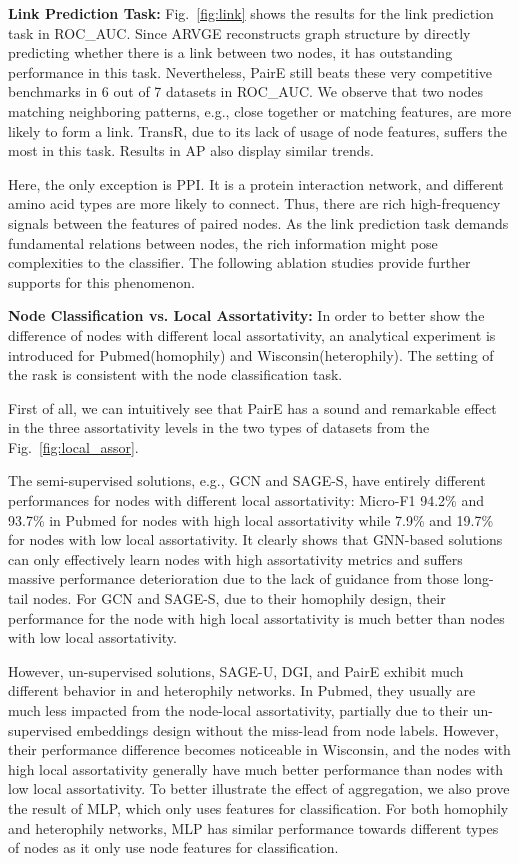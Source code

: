\documentclass[10pt,journal,compsoc]{IEEEtran}
\begin{document}
\noindent\textbf{Link Prediction Task:} Fig.~\ref{fig:link} shows the results for the link prediction task in ROC\_AUC. Since ARVGE reconstructs graph structure by directly predicting whether there is a link between two nodes, it has outstanding performance in this task. Nevertheless, PairE still beats these very competitive benchmarks in 6 out of 7 datasets in ROC\_AUC. We observe that two nodes matching neighboring patterns, e.g., close together or matching features, are more likely to form a link. TransR, due to its lack of usage of node features, suffers the most in this task. Results in AP also display similar trends. 
  
Here, the only exception is PPI. It is a protein interaction network, and different amino acid types are more likely to connect. Thus, there are rich high-frequency signals between the features of paired nodes. As the link prediction task demands fundamental relations between nodes, the rich information might pose complexities to the classifier. The following ablation studies provide further supports for this phenomenon. 


\noindent \textbf{Node Classification vs. Local Assortativity:} In order to better show the difference of nodes with different local assortativity,  an analytical experiment is introduced for Pubmed(homophily) and Wisconsin(heterophily).  The setting of the rask is consistent with the node classification task.

First of all, we can intuitively see that PairE has a sound and remarkable effect in the three assortativity levels in the two types of datasets from the Fig.~\ref{fig:local_assor}.

The semi-supervised solutions, e.g., GCN and SAGE-S, have entirely different performances for nodes with different local assortativity: Micro-F1 94.2\% and 93.7\% in Pubmed for nodes with high local assortativity while 7.9\% and 19.7\% for nodes with low local assortativity. It clearly shows that GNN-based solutions can only effectively learn nodes with high assortativity metrics and suffers massive performance deterioration due to the lack of guidance from those long-tail nodes. For GCN and SAGE-S, due to their homophily design, their performance for the node with high local assortativity is much better than nodes with low local assortativity.

However, un-supervised solutions, SAGE-U, DGI, and PairE exhibit much different behavior in  and heterophily networks. In Pubmed, they usually are much less impacted from the node-local assortativity, partially due to their un-supervised embeddings design without the miss-lead from node labels. However, their performance difference becomes noticeable in Wisconsin, and the nodes with high local assortativity generally have much better performance than nodes with low local assortativity. To better illustrate the effect of aggregation, we also prove the result of MLP, which only uses features for classification. For both homophily and heterophily networks, MLP has similar performance towards different types of nodes as it only use node features for classification. 
\end{document}
